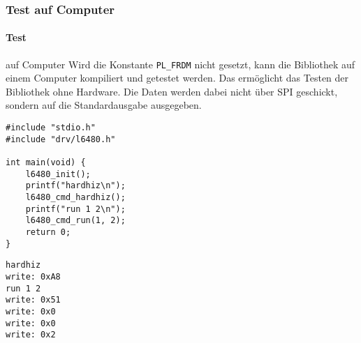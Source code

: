     \clearpage
    \ifSTANDALONE
    \subsubsection{Test auf Computer}   \label{sec:Software_test} 
    \fi
    \ifEMBED
    \paragraph{Test} auf Computer \label{sec:Software_test}
    \fi
    Wird die Konstante \verb?PL_FRDM?  nicht gesetzt, kann die Bibliothek auf 
    einem Computer kompiliert und getestet werden. Das ermöglicht das Testen 
    der Bibliothek ohne Hardware. Die Daten werden dabei nicht über SPI 
    geschickt, sondern auf die Standardausgabe ausgegeben. 
    \begin{lstlisting}[caption={Beispielprogramm für den Test der Bibliothek auf dem Computer}, label={lis:test_source}]
#include "stdio.h"
#include "drv/l6480.h"

int main(void) {
    l6480_init();
    printf("hardhiz\n");
    l6480_cmd_hardhiz();
    printf("run 1 2\n");
    l6480_cmd_run(1, 2);
    return 0;
}
    \end{lstlisting}
    \begin{lstlisting}[caption={Ausgabe vom Testprogramm in \autoref{lis:test_source}}]
hardhiz
write: 0xA8
run 1 2
write: 0x51
write: 0x0
write: 0x0
write: 0x2
    \end{lstlisting}






